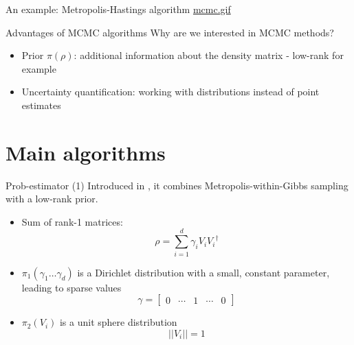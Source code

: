 \documentclass{beamer}
\begin{document}

\begin{frame}{An example: Metropolis-Hastings algorithm}
    \href{run:./mcmc.gif}{mcmc.gif}

\end{frame}

\begin{frame}{Advantages of MCMC algorithms}
    Why are we interested in MCMC methods?
    \begin{itemize}
        \item Prior $\pi(\rho)$: additional information about the density matrix - low-rank for example
        \item Uncertainty quantification: working with distributions instead of point estimates
    \end{itemize} 
\end{frame}
\section{Main algorithms}
\begin{frame}{Prob-estimator (1)}
    Introduced in \cite{MA17}, it combines Metropolis-within-Gibbs sampling with a low-rank prior.
    \begin{itemize}
        \item Sum of rank-1 matrices: \[\rho = \sum_{i=1}^{d} \gamma_i V_i {V_i}^\dagger\]
        \item $\pi_1(\gamma_1 \dots \gamma_d)$ is a Dirichlet distribution with a small, constant parameter, leading to sparse values
        \begin{equation*}
            \gamma = \begin{bmatrix}
                0 & \cdots & 1 & \cdots & 0
            \end{bmatrix}
        \end{equation*}
        \item $\pi_2(V_i)$ is a unit sphere distribution
        \begin{equation*}
            ||V_i|| = 1
        \end{equation*}
    \end{itemize}
\end{frame}
\end{document}
